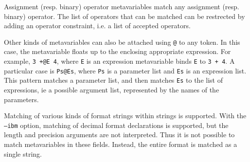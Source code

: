 Assignment (resp. binary) operator metavariables match any assignment
(resp. binary) operator. The list of operators that can be matched can
be restrected by adding an operator constraint, i.e. a list of accepted
operators.

Other kinds of metavariables can also be attached using \texttt{@} to any
token.  In this case, the metavariable floats up to the enclosing
appropriate expression.  For example, {\tt 3 +@E 4}, where {\tt E} is an
expression metavariable binds {\tt E} to {\tt 3 + 4}.  A particular case is
{\tt Ps@Es}, where {\tt Ps} is a parameter list and {\tt Es} is an
expression list.  This pattern matches a parameter list, and then matches
{\tt Es} to the list of expressions, ie a possible argument list,
represented by the names of the parameters.

Matching of various kinds of format strings within strings is supported.
With the {\tt --ibm} option, matching of decimal format declarations is
supported, but the length and precision arguments are not interpreted.
Thus it is not possible to match metavariables in these fields.  Instead,
the entire format is matched as a single string.

\begin{grammar}


    







\end{grammar}

